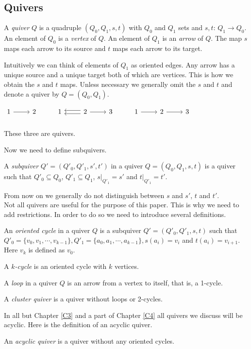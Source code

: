 \subsection{Quivers}
\begin{definition}
A \textit{quiver} $Q$ is a quadruple $(Q_0,Q_1,s,t)$ with $Q_0$ and $Q_1$ sets and $s,t$: $Q_1\rightarrow Q_0$. An element of $Q_0$ is a \textit{vertex} of $Q$. An element of $Q_1$ is an \textit{arrow} of $Q$. The map $s$ maps each arrow to its source and $t$ maps each arrow to its target.
\end{definition}
\indent Intuitively we can think of elements of $Q_1$ as oriented edges. Any arrow has a unique source and a unique target both of which are vertices. This is how we obtain the $s$ and $t$ maps. Unless necessary we generally omit the $s$ and $t$ and denote a quiver by $Q = (Q_0, Q_1)$.\\
\begin{example}
$\begin{tikzcd} 
1 \arrow[r] & 2 & 1 & 2 \arrow[l, shift right]\arrow[l, shift left]\arrow[r] & 3 & 1\arrow[r] & 2\arrow[r] & 3\\
\end{tikzcd}$\\
These three are quivers.
\end{example}
\indent Now we need to define subquivers.\\
\begin{definition}
A \textit{subquiver} $Q' = (Q'_0,Q'_1, s', t')$ in a quiver $Q = (Q_0,Q_1, s, t)$ is a quiver such that $Q'_0\subseteq Q_0$, $Q'_1\subseteq Q_1$, $s|_{Q'_1} = s'$ and $t|_{Q'_1} = t'$.
\end{definition}
\indent From now on we generally do not distinguish between $s$ and $s'$, $t$ and $t'$.\\
\indent Not all quivers are useful for the purpose of this paper. This is why we need to add restrictions. In order to do so we need to introduce several definitions.\\
\begin{definition}
An \textit{oriented cycle} in a quiver $Q$ is a subquiver $Q' = (Q'_0, Q'_1, s, t)$ such that $Q'_0 = \{v_0,v_1,\cdots, v_{k-1}\},Q'_1 = \{a_0,a_1,\cdots, a_{k-1}\}, s(a_i) = v_i$ and $t(a_i) = v_{i+1}$. Here $v_k$ is defined as $v_0$.
\end{definition}
\begin{definition}
A \textit{$k$-cycle} is an oriented cycle with $k$ vertices.
\end{definition}
\begin{definition}
A \textit{loop} in a quiver $Q$ is an arrow from a vertex to itself, that is, a 1-cycle.
\end{definition}
\begin{definition}
A \textit{cluster quiver} is a quiver without loops or 2-cycles. 
\end{definition}
\indent In all but Chapter \ref{C3} and a part of Chapter \ref{C4} all quivers we discuss will be acyclic. Here is the definition of an acyclic quiver.\\
\begin{definition}
An \textit{acyclic quiver} is a quiver without any oriented cycles. 
\end{definition}
